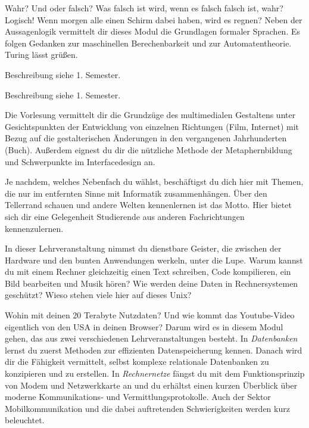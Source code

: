 Wahr?
Und oder falsch?
Was falsch ist wird, wenn es falsch falsch ist, wahr?
Logisch!
Wenn morgen alle einen Schirm dabei haben, wird es regnen?
Neben der Aussagenlogik vermittelt dir dieses Modul die Grundlagen formaler Sprachen.
Es folgen Gedanken zur maschinellen Berechenbarkeit und zur Automatentheorie.
Turing lässt grüßen.

Beschreibung siehe 1. Semester.

Beschreibung siehe 1. Semester.

Die Vorlesung vermittelt dir die Grundzüge des multimedialen Gestaltens unter Gesichtspunkten der Entwicklung von einzelnen Richtungen (Film, Internet) mit Bezug auf die gestalterischen Änderungen in den vergangenen Jahrhunderten (Buch).
Außerdem eignest du dir die nützliche Methode der Metaphernbildung und Schwerpunkte im Interfacedesign an.

\newpage

Je nachdem, welches Nebenfach du wählst, beschäftigst du dich hier mit Themen, die nur im entfernten Sinne mit Informatik zusammenhängen.
Über den Tellerrand schauen und andere Welten kennenlernen ist das Motto.
Hier bietet sich dir eine Gelegenheit Studierende aus anderen Fachrichtungen kennenzulernen.

In dieser Lehrveranstaltung nimmst du dienstbare Geister, die zwischen der Hardware und den bunten Anwendungen werkeln, unter die Lupe.
Warum kannst du mit einem Rechner gleichzeitig einen Text schreiben, Code kompilieren, ein Bild bearbeiten und Musik hören?
Wie werden deine Daten in Rechnersystemen geschützt?
Wieso stehen viele hier auf dieses Unix?


Wohin mit deinen 20 Terabyte Nutzdaten? Und wie kommt das Youtube-Video eigentlich von den USA in deinen Browser?
Darum wird es in diesem Modul gehen, das aus zwei verschiedenen Lehrveranstaltungen besteht.
In \textit{Datenbanken} lernst du zuerst Methoden zur effizienten Datenspeicherung kennen.
Danach wird dir die Fähigkeit vermittelt, selbst komplexe relationale Datenbanken zu konzipieren und zu erstellen.
In \textit{Rechnernetze} fängst du mit dem Funktionsprinzip von Modem und Netzwerkkarte an und du erhältst einen kurzen Überblick über moderne Kommunikations- und Vermittlungsprotokolle.
Auch der Sektor Mobilkommunikation und die dabei auftretenden Schwierigkeiten werden kurz beleuchtet.

